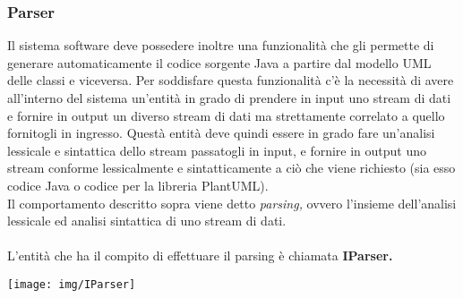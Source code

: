 \documentclass{article}
\begin{document}
  \subsubsection{Parser}
  Il sistema software deve possedere inoltre una funzionalità che gli permette di generare automaticamente il codice sorgente Java a partire dal modello UML delle
  classi e viceversa. Per soddisfare questa funzionalità c'è la necessità di avere all'interno del sistema un'entità in grado di prendere in input uno stream di dati
  e fornire in output un diverso stream di dati ma strettamente correlato a quello fornitogli in ingresso. Questà entità deve quindi essere in grado fare
  un'analisi lessicale e sintattica dello stream passatogli in input, e fornire in output uno stream conforme lessicalmente e sintatticamente a ciò che viene
  richiesto (sia esso codice Java o codice per la libreria PlantUML).\\
  Il comportamento descritto sopra viene detto \textit{parsing,} ovvero l'insieme dell'analisi lessicale ed analisi sintattica di uno stream di dati.\\
  \\L'entità che ha il compito di effettuare il parsing è chiamata \textbf{IParser.}
  \begin{center}
    \texttt{[image: img/IParser]}
  \end{center}
\end{document}
